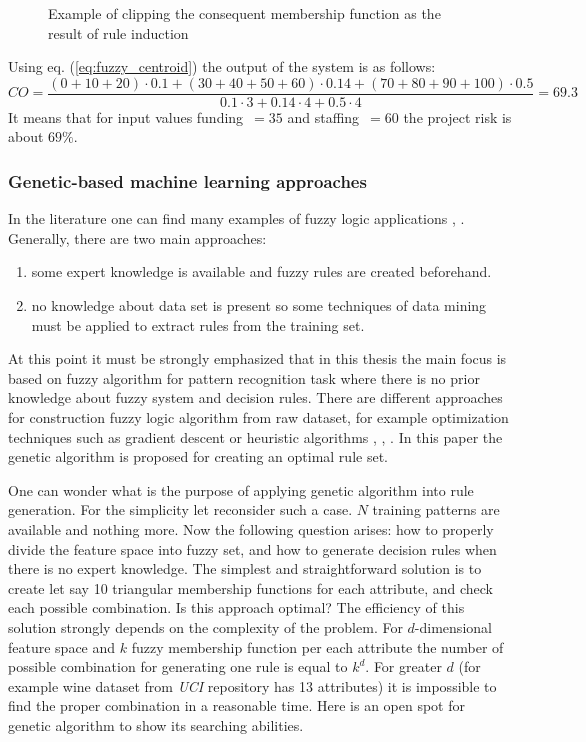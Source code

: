 \begin{enumerate}
\begin{figure}[H]
\begin{center}
            \end{center}
            \caption{Example of clipping the consequent membership function
            as the result of rule induction}
            \label{fig:fuzzy_centroid}
        \end{figure}
        Using eq. (\ref{eq:fuzzy_centroid}) the output of the system is as follows:
        $$
        CO = \frac{(0+10+20)\cdot 0.1 + (30+40+50+60)\cdot 0.14 + (70 + 80 + 90
        + 100)\cdot 0.5}{0.1\cdot 3 + 0.14\cdot 4 + 0.5\cdot 4 } = 69.3
        $$
    It means that for input values funding~$=35$ and staffing~$=60$ the project
    risk is about $69\%$.
\end{enumerate}
\subsubsection{Genetic-based machine learning approaches}
In the literature one can find many examples of fuzzy logic applications
\cite{bib3}, \cite{bib9}.
Generally, there are two main approaches:
\begin{enumerate}
    \item some expert knowledge is available and fuzzy rules are created
        beforehand.
    \item no knowledge about data set is present so some techniques of data
        mining must be applied to extract rules from the training set.
\end{enumerate}
At this point it must be strongly emphasized that in this thesis the main focus is based on
fuzzy algorithm for pattern recognition task where there is no prior knowledge 
about fuzzy system and decision rules. There are different approaches for
construction fuzzy logic algorithm from raw dataset, for example optimization techniques
such as gradient descent or heuristic algorithms \cite{bib8}, \cite{bib16},
\cite{bib28}. In this paper the genetic algorithm
is proposed for creating an optimal rule set. 

One can wonder what is the purpose of applying genetic algorithm into rule
generation. For the simplicity let reconsider such a case. $N$ training
patterns are available and nothing more. Now the following question arises: 
how to properly divide the feature space into fuzzy set, and how to generate
decision rules when there is no expert knowledge. The simplest and
straightforward solution is to create let say 10 triangular membership functions for each
attribute, and check each possible combination. Is this approach optimal? The
efficiency of this solution strongly depends on the complexity of the problem.
For $d$-dimensional feature space and $k$ fuzzy membership function per each attribute
the number of possible combination for generating one rule is equal to $k^d$.
For greater $d$ (for example wine dataset from \textit{UCI} repository has 13
attributes) it is impossible to find the proper combination in a reasonable
time. Here is an open spot for genetic algorithm to show its searching
abilities.

